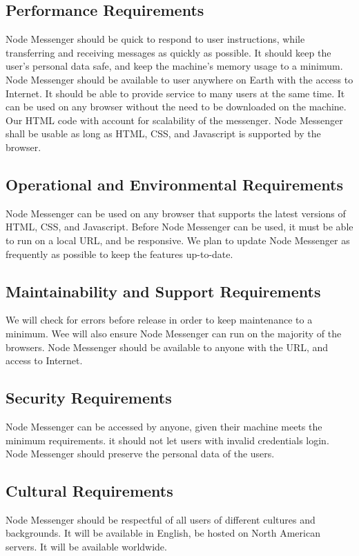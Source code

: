 \documentclass[12pt, titlepage]{article}
\begin{document}
    	\subsection{Performance Requirements}
		Node Messenger should be quick to respond to user instructions, while transferring and receiving messages as quickly as possible. It should keep the user's personal data safe, and keep the machine's memory usage to a minimum. Node Messenger should be available to user anywhere on Earth with the access to Internet. It should be able to provide service to many users at the same time. It can be used on any browser without the need to be downloaded on the machine. Our HTML code with account for scalability of the messenger. Node Messenger shall be usable as long as HTML, CSS, and Javascript is supported by the browser.
    	\subsection{Operational and Environmental Requirements}
		Node Messenger can be used on any browser that supports the latest versions of HTML, CSS, and Javascript. Before Node Messenger can be used, it must be able to run on a local URL, and be responsive. We plan to update Node Messenger as frequently as possible to keep the features up-to-date.
    	\subsection{Maintainability and Support Requirements}
		We will check for errors before release in order to keep maintenance to a minimum. Wee will also ensure Node Messenger can run on the majority of the browsers. Node Messenger should be available to anyone with the URL, and access to Internet.
    	\subsection{Security Requirements}
		Node Messenger can be accessed by anyone, given their machine meets the minimum requirements. it should not let users with invalid credentials login. Node Messenger should preserve the personal data of the users.
    	\subsection{Cultural Requirements}
		Node Messenger should be respectful of all users of different cultures and backgrounds. It will be available in English, be hosted on North American servers. It will be available worldwide. 
\end{document}
